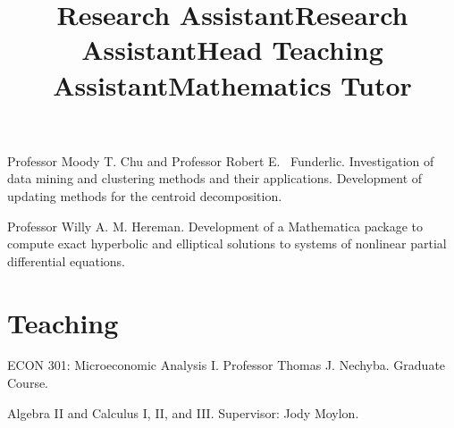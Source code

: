 \documentclass[overlapped,line,draft,11pt,letterpaper]{res}
\begin{document}
\begin{resume}
\title{Research Assistant}
\begin{position}
  Professor Moody T. Chu and Professor Robert E. \
  Funderlic.  Investigation of data mining and clustering methods and
  their applications. Development of updating methods for the centroid
  decomposition.
\end{position}

\title{Research Assistant}
\begin{position}
  Professor Willy A. M. Hereman. Development of a Mathematica
  package to compute exact hyperbolic and elliptical solutions to
  systems of nonlinear partial differential equations.
\end{position}


\section{\bf Teaching}


\title{Head Teaching Assistant}
\begin{position}
  ECON 301: Microeconomic Analysis I. Professor Thomas J. Nechyba.
  Graduate Course.
\end{position}

\title{Mathematics Tutor}
\begin{position}
  Algebra II and Calculus I, II, and III.  Supervisor: Jody Moylon.
\end{position}


%


\end{resume}
\end{document}
